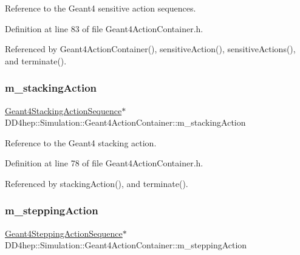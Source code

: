 Reference to the Geant4 sensitive action sequences. 



Definition at line 83 of file Geant4\+Action\+Container.\+h.



Referenced by Geant4\+Action\+Container(), sensitive\+Action(), sensitive\+Actions(), and terminate().

\hypertarget{class_d_d4hep_1_1_simulation_1_1_geant4_action_container_a2fafe23afaf2000c04de123052b7e785}{}\label{class_d_d4hep_1_1_simulation_1_1_geant4_action_container_a2fafe23afaf2000c04de123052b7e785} 
\subsubsection{\texorpdfstring{m\+\_\+stacking\+Action}{m\_stackingAction}}
{\footnotesize\ttfamily \hyperlink{class_d_d4hep_1_1_simulation_1_1_geant4_stacking_action_sequence}{Geant4\+Stacking\+Action\+Sequence}$\ast$ D\+D4hep\+::\+Simulation\+::\+Geant4\+Action\+Container\+::m\+\_\+stacking\+Action\hspace{0.3cm}{\ttfamily [protected]}}



Reference to the Geant4 stacking action. 



Definition at line 78 of file Geant4\+Action\+Container.\+h.



Referenced by stacking\+Action(), and terminate().

\hypertarget{class_d_d4hep_1_1_simulation_1_1_geant4_action_container_a45d1b85f3238c5658fef9a0170c40ae1}{}\label{class_d_d4hep_1_1_simulation_1_1_geant4_action_container_a45d1b85f3238c5658fef9a0170c40ae1} 
\subsubsection{\texorpdfstring{m\+\_\+stepping\+Action}{m\_steppingAction}}
{\footnotesize\ttfamily \hyperlink{class_d_d4hep_1_1_simulation_1_1_geant4_stepping_action_sequence}{Geant4\+Stepping\+Action\+Sequence}$\ast$ D\+D4hep\+::\+Simulation\+::\+Geant4\+Action\+Container\+::m\+\_\+stepping\+Action\hspace{0.3cm}{\ttfamily [protected]}}



